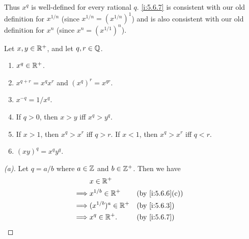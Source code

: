 \begin{note}
  Thus \(x^q\) is well-defined for every rational \(q\).
  \cref{i:5.6.7} is consistent with our old definition for \(x^{1 / n}\) (since \(x^{1 / n} = (x^{1 / n})^1\)) and is also consistent with our old definition for \(x^n\) (since \(x^n = (x^{1 / 1})^n\)).
\end{note}

\begin{lem}\label{i:5.6.9}
  Let \(x, y \in \mathbb{R}^+\), and let \(q, r \in \mathbb{Q}\).
  \begin{enumerate}
    \item \(x^q \in \mathbb{R}^+\).
    \item \(x^{q + r} = x^q x^r\) and \((x^q)^r = x^{qr}\).
    \item \(x^{-q} = 1 / x^q\).
    \item If \(q > 0\), then \(x > y\) iff \(x^q > y^q\).
    \item If \(x > 1\), then \(x^q > x^r\) iff \(q > r\).
          If \(x < 1\), then \(x^q > x^r\) iff \(q < r\).
    \item \((xy)^q = x^q y^q\).
  \end{enumerate}
\end{lem}

\begin{proof}[(a)]
  Let \(q = a / b\) where \(a \in \mathbb{Z}\) and \(b \in \mathbb{Z}^+\).
  Then we have
  \begin{align*}
             & x \in \R^+                                  \\
    \implies & x^{1 / b} \in \R^+     &  & \by{i:5.6.6}[c] \\
    \implies & (x^{1 / b})^a \in \R^+ &  & \by{i:5.6.3}    \\
    \implies & x^q \in \R^+.          &  & \by{i:5.6.7}
  \end{align*}
\end{proof}

